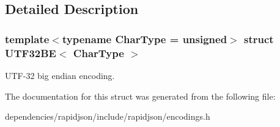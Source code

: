 \subsection{Detailed Description}
\subsubsection*{template$<$typename Char\+Type = unsigned$>$\newline
struct U\+T\+F32\+B\+E$<$ Char\+Type $>$}

U\+T\+F-\/32 big endian encoding. 

The documentation for this struct was generated from the following file\+:\begin{DoxyCompactItemize}
\item 
dependencies/rapidjson/include/rapidjson/encodings.\+h\end{DoxyCompactItemize}
